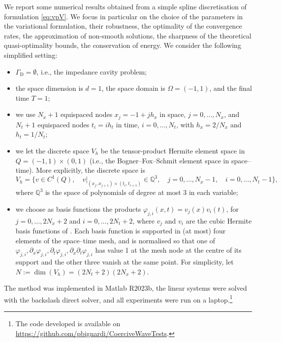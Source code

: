 \documentclass[a4paper]{article}
\theoremstyle{plain}
\theoremstyle{definition}
\newcommand{\GD}{{\Gamma_{\mathrm D}}}
\begin{document}
We report some numerical results obtained from a simple spline discretisation of formulation \eqref{eq:vpV}.
We focus in particular on the choice of the parameters in the variational formulation, their robustness, the optimality of the convergence rates, the approximation of non-smooth solutions, the sharpness of the theoretical quasi-optimality bounds, the conservation of energy.
We consider the following simplified setting:
\begin{itemize}
\item $\GD=\emptyset$, i.e., the impedance cavity problem;
\item the space dimension is $d=1$, the space domain is $\Omega=(-1,1)$, and the final time $T=1$;
\item we use $N_x + 1$ equispaced nodes $x_j = -1 + j h_x$ in space, $j = 0, \dots, N_x$, and $N_t + 1$ equispaced nodes $t_i = i h_t$ in time, $i = 0, \dots, N_t$, with $h_x=2/N_x$ and $h_t=1/N_t$;
\item we let the discrete space $V_h$ be the tensor-product Hermite element space in $Q=(-1,1)\times(0,1)$ (i.e., the Bogner--Fox--Schmit element space in space--time).
More explicitly, the discrete space is
\begin{equation*}
V_h = \big\{v \in C^1(Q),\quad
	v|_{(x_j, x_{j+1})\times(t_i, t_{i+1})} \in \mathbb{Q}^3,\quad j = 0, \dots, N_x-1, \quad i = 0, \dots, N_t-1 \big\},
\end{equation*}
where $\mathbb Q^3$ is the space of polynomials of degree at most 3 in each variable;

\item we choose as basis functions the products $\varphi_{j,i}(x,t)=v_j(x)v_i(t)$,
for $j=0, \dots, 2N_x + 2$ and $ i=0, \dots, 2N_t + 2$, where $v_j$ and $v_i$ are the cubic Hermite basis functions of \cite[Ch.~IV, p.~48]{deBoor2001}.
Each basis function is supported in (at most) four elements of the space--time mesh, and is normalised so that one of $\varphi_{j,i},\partial_x\varphi_{j,i},\partial_t\varphi_{j,i},\partial_x\partial_t\varphi_{j,i}$ has value 1 at the mesh node at the centre of its support and the other three vanish at the same point.
For simplicity, let $N:= \dim(V_h) = (2N_t + 2)(2N_x + 2)$.
\end{itemize}
The method was implemented in Matlab R2023b, the linear systems were solved with the backslash direct solver, and all experiments were run on a laptop.\footnote{The code developed is available on \url{https://github.com/pbignardi/CoerciveWaveTests}.}
\end{document}
